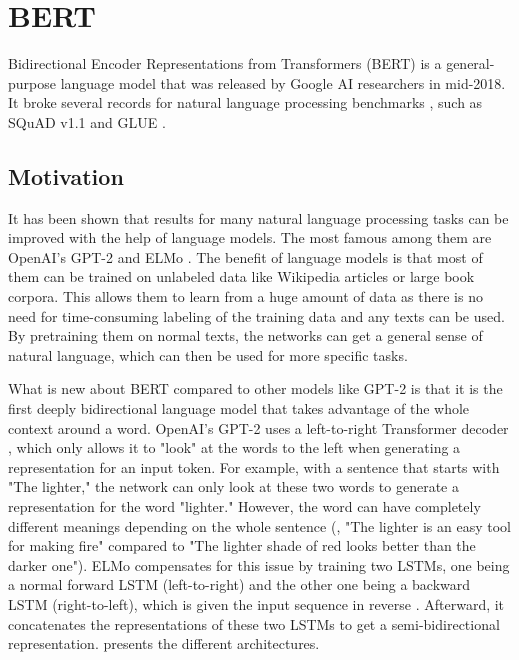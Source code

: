 
\section{BERT}\label{sec:bert}

Bidirectional Encoder Representations from Transformers (BERT) is a general-purpose language model that was released by Google AI researchers in mid-2018.
It broke several records for natural language processing benchmarks \cite[p.~5--7]{devlin2018bert}, such as  SQuAD v1.1 \cite{rajpurkar-etal-2016-squad} and GLUE \cite{1804.07461}.

\subsection{Motivation}

It has been shown that results for many natural language processing tasks can be improved with the help of language models.
The most famous among them are OpenAI's GPT-2 \cite{radford2019language} and ELMo \cite{1802.05365}.
The benefit of language models is that most of them can be trained on unlabeled data like Wikipedia articles or large book corpora.
This allows them to learn from a huge amount of data as there is no need for time-consuming labeling of the training data and any texts can be used.
By pretraining them on normal texts, the networks can get a general sense of natural language, which can then be used for more specific tasks.

What is new about BERT compared to other models like GPT-2 is that it is the first deeply bidirectional language model that takes advantage of the whole context around a word.
OpenAI's GPT-2 uses a left-to-right Transformer decoder \cite[p.~4]{radford2019language}, which only allows it to "look" at the words to the left when generating a representation for an input token.
For example, with a sentence that starts with "The lighter," the network can only look at these two words to generate a representation for the word "lighter."
However, the word can have completely different meanings depending on the whole sentence (\eg, "The lighter is an easy tool for making fire" compared to "The lighter shade of red looks better than the darker one"). 
ELMo compensates for this issue by training two LSTMs, one being a normal forward LSTM (left-to-right) and the other one being a backward LSTM (right-to-left), which is given the input sequence in reverse \cite[p.~2--3]{1802.05365}.
Afterward, it concatenates the representations of these two LSTMs to get a semi-bidirectional representation.
 presents the different architectures.

